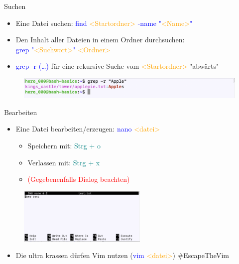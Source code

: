 \documentclass[t, xcolor=dvipsnames]{beamer}
\begin{document}
\begin{frame}{Suchen}
	\begin{itemize}
		\item Eine Datei suchen: \textcolor{blue}{find} \textcolor{orange}{<Startordner>} \textcolor{blue}{-name "}\textcolor{orange}{<Name>}\textcolor{blue}{"}
        \item Den Inhalt aller Dateien in einem Ordner durchsuchen:\\ \textcolor{blue}{grep "}\textcolor{orange}{<Suchwort>}\textcolor{blue}{"} \textcolor{orange}{<Ordner>}
        \item \textcolor{blue}{grep -r} \textcolor{blue}{(\dots)} für eine rekursive Suche vom \textcolor{orange}{<Startordner>} "abwärts"
	\end{itemize}
	\begin{figure}
		\centering
		\includegraphics[width= 1\textwidth]{graphics/grep}
	\end{figure}
\end{frame}

\begin{frame}{Bearbeiten}
    \begin{itemize}
        \item Eine Datei bearbeiten/erzeugen: \textcolor{blue}{nano} \textcolor{orange}{<datei>}
        \begin{itemize}
            \item Speichern mit: \textcolor{teal}{Strg + o}
            \item Verlassen mit: \textcolor{teal}{Strg + x}
            \item \textcolor{red}{(Gegebenenfalls Dialog beachten)}
        \end{itemize}
    \end{itemize}
    
    \begin{figure}
        \centering
        \includegraphics[width=0.55\textwidth]{graphics/nano}
    \end{figure}
    
    \begin{itemize}
    	\item Die ultra krassen dürfen Vim nutzen (\textcolor{blue}{vim }\textcolor{orange}{<datei>}) \#EscapeTheVim
    \end{itemize}
\end{frame}
\end{document}
